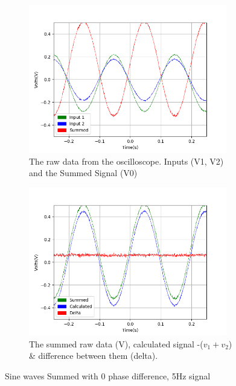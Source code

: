 \begin{figure}[h!]
\centering
\begin{subfigure}[t]{.475\textwidth}
  \centering
  \includegraphics[width=0.95\textwidth, height=0.20\textheight]{figures/Summing/scope_1raw.png}
  \caption{The raw data from the oscilloscope. Inputs (V1, V2) and the Summed Signal (V0)}
 \label{fig:sum_1_og_data}
\end{subfigure}\hfill
\begin{subfigure}[t]{.475\textwidth}
  \centering
  \includegraphics[width=0.95\textwidth, height=0.20\textheight]{figures/Summing/scope_1.png}
  \caption{The summed raw data (V), calculated signal -($v_1 + v_2$) \& difference between them (delta).}
\label{fig:sum_1_calc_data}
\end{subfigure}
\caption{Sine waves Summed with 0 phase difference, 5Hz signal}
\label{fig:sum_1}
\end{figure}
